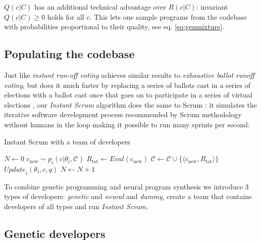 $Q(c|C)$ has an additional technical advantage over $R(c|C)$: invariant $Q(c|C) \geq 0$ holds for all $c$.
This lets one sample programs from the codebase with probabilities proportional to their quality, see eq. \ref{eq:genmixture}.

\newpage \subsection{Populating the codebase}

Just like \emph{instant run-off voting} achieves similar results to \emph{exhaustive ballot runoff voting}, but does it much faster by replacing a series of ballots cast in a series of elections with a ballot cast once that goes on to participate in a series of virtual elections \cite{votingsystems}, our \emph{Instant Scrum} algorithm does the same to Scrum \cite{scrum}: it simulates the iterative software development process recommended by Scrum methodology without humans in the loop making it possible to run many sprints per second:

\begin{algorithm}[H]
\begin{algorithmic}[1]
\caption{Instant Scrum with a team of developers}
\label{alg:instantscrum}
\State $N \gets 0$
\State $c_\text{new}\sim p_i(c | \theta_i, \mathcal{C})$ 
\State $R_\text{tot} \gets \mathit{Eval}(c_\text{new})$
\State $\mathcal{C} \gets \mathcal{C} \cup \{\langle c_\text{new}, R_\text{tot} \rangle\}$
\State $\mathit{Update}_i(\theta_i, c, q)$
\State $N \gets N+1$
\EndFor
\EndWhile
\EndProcedure
\end{algorithmic}
\end{algorithm}

To combine genetic programming and neural program synthesis we introduce 3 types of developers: \emph{genetic} and \emph{neural} and \emph{dummy}, create a team that contains developers of all types and run \emph{Instant Scrum}.

\newpage \subsection{Genetic developers}
\label{sec:genetic}

